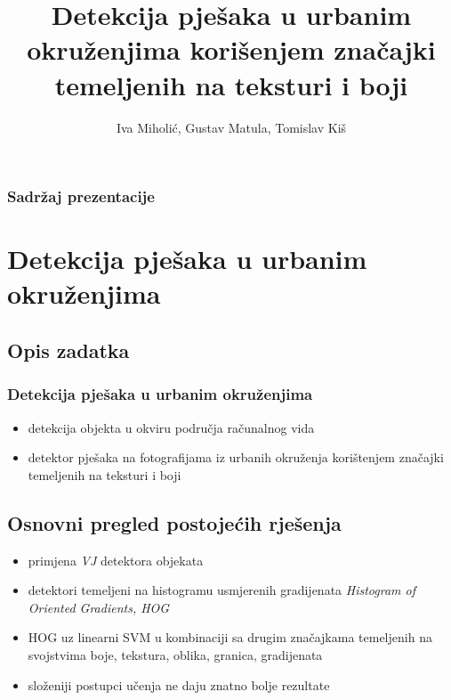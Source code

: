 \documentclass{beamer}
\title{Detekcija pješaka u urbanim okruženjima korišenjem značajki temeljenih na teksturi i boji}
\author{Iva Miholić, Gustav Matula, Tomislav Kiš}
\begin{document}
\begin{frame}
\maketitle
\end{frame}

\begin{frame}
\frametitle{Sadržaj prezentacije}
\tableofcontents
\end{frame}

\section{Detekcija pješaka u urbanim okruženjima}
\subsection{Opis zadatka}
\begin{frame}
\frametitle{Detekcija pješaka u urbanim okruženjima}
\begin{itemize}
\item detekcija objekta u okviru područja računalnog vida
\item detektor pješaka na fotografijama iz urbanih okruženja korištenjem značajki temeljenih na teksturi i boji
\end{itemize}
\end{frame}

\subsection{Osnovni pregled postojećih rješenja}
\begin{frame}
\begin{itemize}
\frametitle{Osnovni pregled postojećih rješenja}
\item primjena \emph{VJ} detektora objekata \cite{VJ}
\item detektori temeljeni na histogramu usmjerenih gradijenata \emph{Histogram of Oriented Gradients, HOG} \cite{HOG}
\item HOG uz linearni SVM u kombinaciji sa drugim značajkama temeljenih na svojstvima boje, tekstura, oblika, granica, gradijenata
\item složeniji postupci učenja ne daju znatno bolje rezultate \cite{BenensonOHS14}
\end{itemize}
\end{frame}
\end{document}
